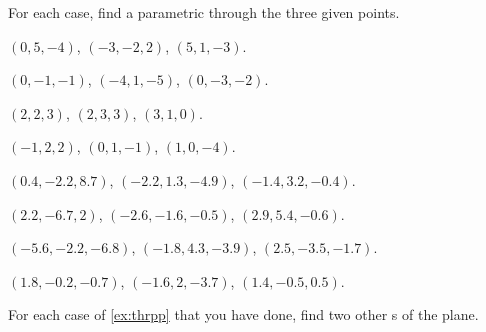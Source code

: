\begin{exercise} \label{ex:thrpp} 
For each case, find a parametric  through the three given points.
\begin{Parts}
\item 
\((0,5,-4)\),
\((-3,-2,2)\),
\((5,1,-3)\).

\item
\((0,-1,-1)\),
\((-4,1,-5)\),
\((0,-3,-2)\).

\begin{reduce}
\item 
\((2,2,3)\),
\((2,3,3)\),
\((3,1,0)\).

\item
\((-1,2,2)\),
\((0,1,-1)\),
\((1,0,-4)\).

\item
\((0.4,-2.2,8.7)\),
\((-2.2,1.3,-4.9)\),
\((-1.4,3.2,-0.4)\).

\item
\((2.2,-6.7,2)\),
\((-2.6,-1.6,-0.5)\),
\((2.9,5.4,-0.6)\).
\end{reduce}

\item
\((-5.6,-2.2,-6.8)\),
\((-1.8,4.3,-3.9)\),
\((2.5,-3.5,-1.7)\).

\item
\((1.8,-0.2,-0.7)\),
\((-1.6,2,-3.7)\),
\((1.4,-0.5,0.5)\).

\end{Parts}
\end{exercise}


\begin{exercise}  
For each case of \cref{ex:thrpp} that you have done, find two other s of the plane.
\end{exercise}




